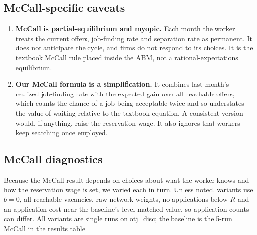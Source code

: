 \documentclass[10pt]{article}
\begin{document}
\subsection*{McCall-specific caveats}
\begin{enumerate}[leftmargin=*]
  \item \textbf{McCall is partial-equilibrium and myopic.} Each month the worker treats the current offers,
  job-finding rate and separation rate as permanent. It does not anticipate the cycle, and firms do not
  respond to its choices. It is the textbook McCall rule placed inside the ABM, not a rational-expectations
  equilibrium.
  \item \textbf{Our McCall formula is a simplification.} It combines last month's realized job-finding rate
  with the expected gain over all reachable offers, which counts the chance of a job being acceptable twice and
  so understates the value of waiting relative to the textbook equation. A consistent version would, if
  anything, raise the reservation wage. It also ignores that workers keep searching once employed.
\end{enumerate}

\subsection*{McCall diagnostics}
Because the McCall result depends on choices about what the worker knows and how the reservation wage is set,
we varied each in turn. Unless noted, variants use $b = 0$, all reachable vacancies, raw network weights, no
applications below $R$ and an application cost near the baseline's level-matched value, so application counts
can differ. All variants are single runs on otj\_disc; the baseline is the 5-run McCall in the results table.
\end{document}
